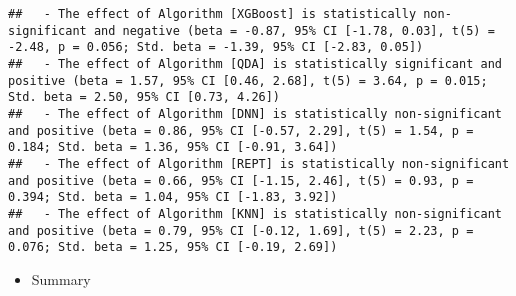 \documentclass[
]{article}
\newenvironment{Shaded}{\begin{snugshade}}{\end{snugshade}}
\newcommand{\AttributeTok}[1]{\textcolor[rgb]{0.13,0.29,0.53}{#1}}
\newcommand{\CommentTok}[1]{\textcolor[rgb]{0.56,0.35,0.01}{\textit{#1}}}
\newcommand{\FunctionTok}[1]{\textcolor[rgb]{0.13,0.29,0.53}{\textbf{#1}}}
\newcommand{\NormalTok}[1]{#1}
\newcommand{\OtherTok}[1]{\textcolor[rgb]{0.56,0.35,0.01}{#1}}
\newcommand{\SpecialCharTok}[1]{\textcolor[rgb]{0.81,0.36,0.00}{\textbf{#1}}}
\newcommand{\StringTok}[1]{\textcolor[rgb]{0.31,0.60,0.02}{#1}}
\providecommand{\tightlist}{%
  \setlength{\itemsep}{0pt}\setlength{\parskip}{0pt}}
\begin{document}
\begin{verbatim}
##   - The effect of Algorithm [XGBoost] is statistically non-significant and negative (beta = -0.87, 95% CI [-1.78, 0.03], t(5) = -2.48, p = 0.056; Std. beta = -1.39, 95% CI [-2.83, 0.05])
##   - The effect of Algorithm [QDA] is statistically significant and positive (beta = 1.57, 95% CI [0.46, 2.68], t(5) = 3.64, p = 0.015; Std. beta = 2.50, 95% CI [0.73, 4.26])
##   - The effect of Algorithm [DNN] is statistically non-significant and positive (beta = 0.86, 95% CI [-0.57, 2.29], t(5) = 1.54, p = 0.184; Std. beta = 1.36, 95% CI [-0.91, 3.64])
##   - The effect of Algorithm [REPT] is statistically non-significant and positive (beta = 0.66, 95% CI [-1.15, 2.46], t(5) = 0.93, p = 0.394; Std. beta = 1.04, 95% CI [-1.83, 3.92])
##   - The effect of Algorithm [KNN] is statistically non-significant and positive (beta = 0.79, 95% CI [-0.12, 1.69], t(5) = 2.23, p = 0.076; Std. beta = 1.25, 95% CI [-0.19, 2.69])
\end{verbatim}

\begin{itemize}
\tightlist
\item
  Summary
\end{itemize}

\begin{Shaded}
\end{Shaded}
\end{document}
